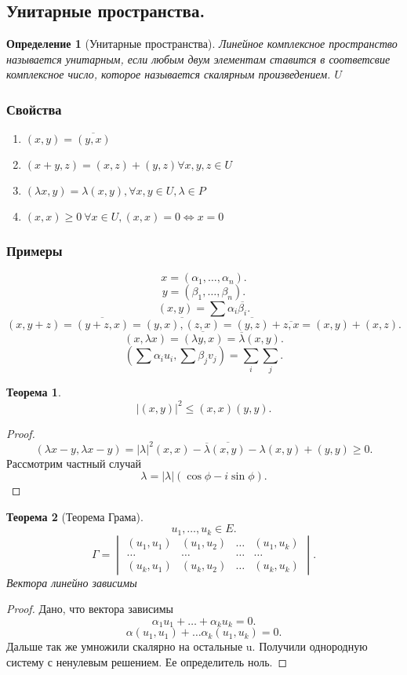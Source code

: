 \documentclass{scrartcl}
\newtheorem{theorem}{Теорема}
\newtheorem{definition}{Определение}
\begin{document}
\subsection{Унитарные пространства.}
\begin{definition}[Унитарные пространства]
    Линейное комплексное пространство называется унитарным, если любым двум элементам ставится в соответсвие комплексное число, которое называется скалярным произведением.
    $U$
\end{definition}
\subsubsection{Свойства}
\begin{enumerate}
    \item $(x,y) = \overline{(y,x)}$
    \item $(x+y,z) = (x,z) + (y,z) \forall  x,y,z \in U$
    \item $(\lambda x,y) = \lambda (x,y) , \forall  x,y \in U,\lambda \in P $
    \item $(x,x) \ge  0 ~\forall  x \in U, (x,x) = 0 \iff x = 0$
\end{enumerate}
\subsubsection{Примеры}
\[
x = (\alpha_1,\dots,\alpha_{n})
.\] 
\[
y = (\beta_1,\dots,\beta_{n})
.\] 
\[
    (x,y) = \sum \alpha_{i} \overline{\beta_{i}}
.\] 
\[
    (x,y + z) = \overline{(y + z,x)} = \overline{(y,x),(z,x)} = \overline{(y,z)} + \overline{z,x}=  (x,y) + (x,z)
.\] 
\[
    (x,\lambda x) = \overline{(\lambda y,x)} = \overline{\lambda} (x,y)
.\] 
\[
    (\sum \alpha_{i} u_{i},\sum \beta_{j} v_{j}) = \sum_{i}\sum_{j}
.\] 
\begin{theorem}
\[
|(x,y)|^2 \le  (x,x)(y,y)
.\] 
\end{theorem}
\begin{proof}
    \[
        (\lambda x - y , \lambda x - y) =
        |\lambda|^2(x,x) - \overline{\lambda} \overline{(x,y)} - \lambda(x,y) + (y,y) \ge  0
    .\] 
    Рассмотрим частный случай
    \[
        \lambda = |\lambda| (\cos{\phi} - i \sin{\phi})
    .\] 
\end{proof}
\begin{theorem}[Теорема Грама]
    \[
    u_1,\dots,u_{k} \in E
    .\] 
    \[
    \Gamma = 
    \begin{vmatrix}
        (u_1,u_1) & (u_1,u_2) & \dots & (u_1,u_{k})\\
        \dots & \dots & \dots & \dots\\
        (u_{k},u_1) & (u_{k},u_2) & \dots & (u_{k},u_{k})
    \end{vmatrix} 
    .\] 
    Вектора линейно зависимы
\end{theorem}
\begin{proof}
    Дано, что вектора зависимы
    \[
    \alpha_{1}u_1 + \dots + \alpha_{k} u_{k} = 0
    .\] 
    \[
    \alpha (u_1,u_1) + \dots \alpha_{k} (u_1,u_{k}) = 0
    .\] 
    Дальше так же умножили скалярно на остальные u. Получили однородную систему с ненулевым решением. Ее определитель ноль.
\end{proof}
\end{document}
